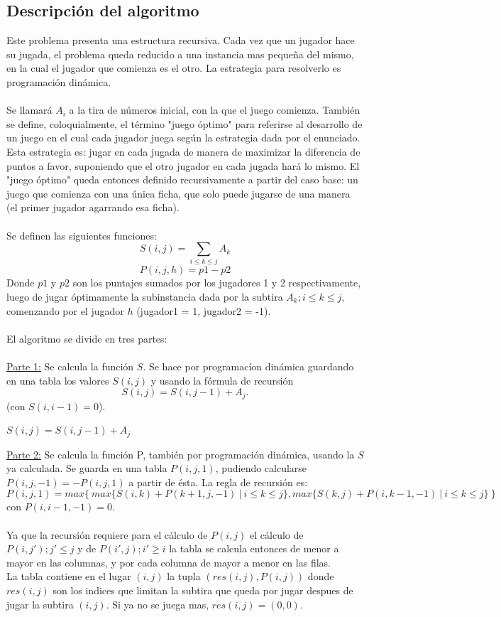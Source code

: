 \subsection{Descripci\'on del algoritmo}
Este problema presenta una estructura recursiva. Cada vez que un jugador hace su jugada, el problema queda reducido a una instancia mas peque\~na del mismo, en la cual el jugador que comienza es el otro. La estrategia para resolverlo es programaci\'on din\'amica.\\
\\
Se llamar\'a $ A_{i}$ a la tira de n\'umeros inicial, con la que el juego comienza. Tambi\'en se define, coloquialmente, el t\'ermino "juego \'optimo" para referirse al desarrollo de un juego en el cual cada jugador juega seg\'un la estrategia dada por el enunciado. Esta estrategia es: jugar en cada jugada de manera de maximizar la diferencia de puntos a favor, suponiendo que el otro jugador en cada jugada har\'a lo mismo. El "juego \'optimo" queda entonces definido recursivamente a partir del caso base: un juego que comienza con una \'unica ficha, que solo puede jugarse de una manera (el primer jugador agarrando esa ficha).\\
\\
Se definen las siguientes funciones:\\
$$S(i,j)=\sum_{i \le k \le j} A_{k}$$
$$P(i,j,h)= p1 - p2$$
Donde $p1$ y $p2$ son los puntajes sumados por los jugadores 1 y 2 respectivamente, luego de jugar \'optimamente la subinstancia dada por la subtira $A_{k} ; i \le k \le j $, comenzando por el jugador $h$ (jugador1 = 1, jugador2 = -1).\\
\\
El algoritmo se divide en tres partes:\\
\\
\underline{Parte 1:} Se calcula la funci\'on $S$. Se hace por programac\'ion din\'amica guardando en una tabla los valores $S(i,j)$ y usando la f\'ormula de recursi\'on $$S(i,j) = S(i,j-1) + A_{j}.$$ (con $S(i,i-1)=0$).\\
\begin{algorithmic}
		\State $S(i,j) = S(i,j-1) + A_{j}$ 
	\EndFor
\EndFor
\end{algorithmic}
\underline{Parte 2:} Se calcula la funci\'on P, tambi\'en por programaci\'on din\'amica, usando la $S$ ya calculada. Se guarda en una tabla $P(i,j,1)$, pudiendo calcularse $P(i,j,-1) = -P(i,j,1)$ a partir de \'esta. La regla de recursi\'on es:
$$P(i,j,1) = max \{ \ max\{ S(i,k) + P(k+1,j,-1) \ | \  i \le k \le j \} , max\{ S(k,j) + P(i,k-1,-1) \ | \ i \le k\le j \} \ \}$$ con $P(i,i-1,-1) = 0$.\\
\\
Ya que la recursi\'on requiere para el c\'alculo de $P(i,j)$ el c\'alculo de $P(i,j') ; j' \le j$ y de $P(i',j) ; i' \ge i$ la tabla se calcula entonces de menor a mayor en las columnas, y por cada columna de mayor a menor en las filas.\\
La tabla contiene en el lugar $(i,j)$ la tupla $(res(i,j),P(i,j))$ donde $res(i,j)$ son los indices que limitan la subtira que queda por jugar despues de jugar la subtira $(i,j)$. Si ya no se juega mas, $res(i,j)=(0,0) $.\\

